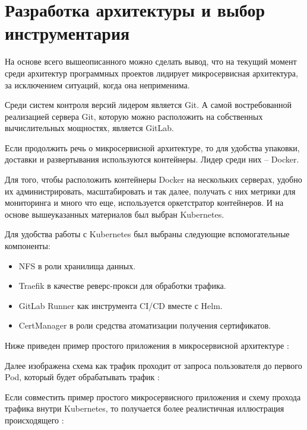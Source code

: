 \section{Разработка архитектуры и выбор инструментария}
\label{sec:tools}

На основе всего вышеописанного можно сделать вывод, что на текущий момент среди архитектур программных проектов лидирует микросервисная архитектура, за исключением ситуаций, когда она неприменима.

Среди систем контроля версий лидером является Git. А самой востребованной реализацией сервера Git, которую можно расположить на собственных вычислительных мощностях, является GitLab.

Если продолжить речь о микросервисной архитектуре, то для удобства упаковки, доставки и развертывания используются контейнеры. Лидер среди них -- Docker.

Для того, чтобы расположить контейнеры Docker на нескольких серверах, удобно их администрировать, масштабировать и так далее, получать с них метрики для мониторинга и много что еще, используется оркетстратор контейнеров. И на основе вышеуказанных материалов был выбран Kubernetes.

Для удобства работы с Kubernetes был выбраны следующие вспомогательные компоненты:
\begin{itemize}
    \item NFS в роли хранилища данных.
    \item Traefik в качестве реверс-прокси для обработки трафика.
    \item GitLab Runner как инструмента CI/CD вместе с Helm.
    \item CertManager в роли средства атоматизации получения сертификатов.
\end{itemize}

Ниже приведен пример простого приложения в микросервисной архитектуре :

Далее изображена схема как трафик проходит от запроса пользователя до первого Pod, который будет обрабатывать трафик :

Если совместить пример простого микросервисного приложения  и схему прохода трафика внутри Kubernetes, то получается более реалистичная иллюстрация происходящего :

